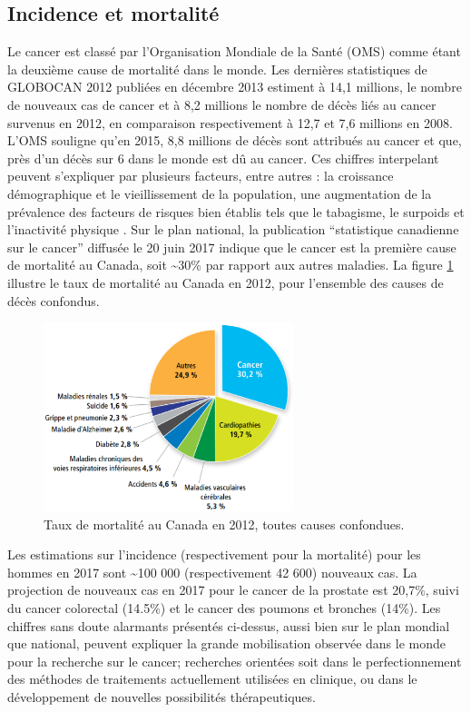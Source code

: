 \subsection{Incidence et mortalité}
Le cancer est classé par l’Organisation Mondiale de la Santé (OMS) \cite{OMS}  comme étant la deuxième cause de mortalité dans le monde. Les dernières statistiques de GLOBOCAN 2012 \cite{GLOBOCAN} publiées en décembre 2013 estiment à 14,1 millions, le nombre de nouveaux cas de cancer et à 8,2 millions le nombre de décès liés au cancer survenus en 2012, en comparaison respectivement à 12,7 et 7,6 millions en 2008. L’OMS souligne qu’en 2015, 8,8 millions de décès sont attribués au cancer et que, près d’un décès sur 6 dans le monde est dû au cancer. Ces chiffres interpelant peuvent s’expliquer par plusieurs facteurs, entre autres : la croissance démographique et le vieillissement de la population, une augmentation de la prévalence des facteurs de risques bien établis tels que le tabagisme, le surpoids et l’inactivité physique \cite{Torre}. Sur le plan national, la publication \enquote{statistique canadienne sur le cancer} diffusée le 20 juin 2017 \cite{StatCanada} indique que le cancer est la première cause de mortalité au Canada, soit \textasciitilde 30\% par rapport aux autres maladies. La figure \ref{FigureStatCancer1} \cite{StatCanada} illustre le taux de mortalité au Canada en 2012, pour l’ensemble des causes de décès confondus.
%
\begin{figure}[ht]
\centering
\includegraphics[width=7.3cm,height=5.5cm]{FigureStatCancer1.eps}
\caption{\label{FigureStatCancer1} Taux de mortalité au Canada en 2012, toutes causes confondues.}
\end{figure}
%
Les estimations sur l’incidence (respectivement pour la mortalité) pour les hommes en 2017 sont \textasciitilde 100 000 (respectivement 42 600) nouveaux cas. La projection de nouveaux cas en 2017 pour le cancer de la prostate est 20,7\%, suivi du cancer colorectal (14.5\%) et le cancer des poumons et bronches (14\%). Les chiffres sans doute alarmants présentés ci-dessus, aussi bien sur le plan mondial que national, peuvent expliquer la grande mobilisation observée dans le monde pour la recherche sur le cancer; recherches orientées soit dans le perfectionnement des méthodes de traitements actuellement utilisées en clinique, ou dans le développement de nouvelles possibilités thérapeutiques.
%
